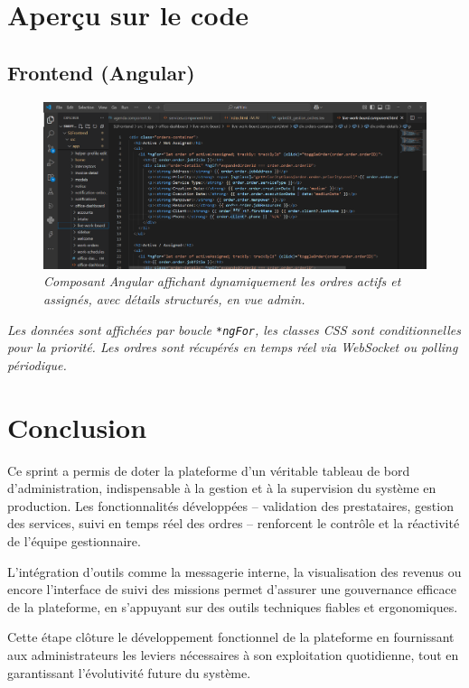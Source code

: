 \section*{Aperçu sur le code}

\subsection*{Frontend (Angular)}
\begin{figure}[H]
\centering
\includegraphics[width=0.85\linewidth]{figures/aperc front.png}
\caption*{\textit{Composant Angular affichant dynamiquement les ordres actifs et assignés, avec détails structurés, en vue admin.}}
\end{figure}
\textit{Les données sont affichées par boucle \texttt{*ngFor}, les classes CSS sont conditionnelles pour la priorité. Les ordres sont récupérés en temps réel via WebSocket ou polling périodique.}

\section*{Conclusion}

Ce sprint a permis de doter la plateforme d’un véritable tableau de bord d’administration, indispensable à la gestion et à la supervision du système en production. Les fonctionnalités développées – validation des prestataires, gestion des services, suivi en temps réel des ordres – renforcent le contrôle et la réactivité de l’équipe gestionnaire.

L’intégration d’outils comme la messagerie interne, la visualisation des revenus ou encore l’interface de suivi des missions permet d’assurer une gouvernance efficace de la plateforme, en s’appuyant sur des outils techniques fiables et ergonomiques.

Cette étape clôture le développement fonctionnel de la plateforme en fournissant aux administrateurs les leviers nécessaires à son exploitation quotidienne, tout en garantissant l’évolutivité future du système.



